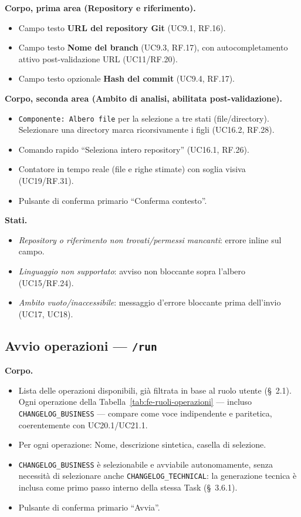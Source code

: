\documentclass[11pt,a4paper]{article}
\begin{document}
\textbf{Corpo, prima area (Repository e riferimento).}
\begin{itemize}
    \item Campo testo \textbf{URL del repository Git} (UC9.1, RF.16).
    \item Campo testo \textbf{Nome del branch} (UC9.3, RF.17), con autocompletamento attivo post-validazione URL (UC11/RF.20).
    \item Campo testo opzionale \textbf{Hash del commit} (UC9.4, RF.17).
\end{itemize}

\textbf{Corpo, seconda area (Ambito di analisi, abilitata post-validazione).}
\begin{itemize}
    \item \texttt{Componente: Albero file} per la selezione a tre stati (file/directory). Selezionare una directory marca ricorsivamente i figli (UC16.2, RF.28).
    \item Comando rapido ``Seleziona intero repository'' (UC16.1, RF.26).
    \item Contatore in tempo reale (file e righe stimate) con soglia visiva (UC19/RF.31).
    \item Pulsante di conferma primario ``Conferma contesto''.
\end{itemize}

\textbf{Stati.}
\begin{itemize}
    \item \emph{Repository o riferimento non trovati/permessi mancanti}: errore inline sul campo.
    \item \emph{Linguaggio non supportato}: avviso non bloccante sopra l'albero (UC15/RF.24).
    \item \emph{Ambito vuoto/inaccessibile}: messaggio d'errore bloccante prima dell'invio (UC17, UC18).
\end{itemize}

\subsection{Avvio operazioni --- \texttt{/run}}

\textbf{Corpo.}
\begin{itemize}
    \item Lista delle operazioni disponibili, già filtrata in base al ruolo utente (\S~2.1). Ogni operazione della Tabella~\ref{tab:fe-ruoli-operazioni} --- incluso \texttt{CHANGELOG\_BUSINESS} --- compare come voce indipendente e paritetica, coerentemente con UC20.1/UC21.1.
    \item Per ogni operazione: Nome, descrizione sintetica, casella di selezione.
    \item \texttt{CHANGELOG\_BUSINESS} è selezionabile e avviabile autonomamente, senza necessità di selezionare anche \texttt{CHANGELOG\_TECHNICAL}: la generazione tecnica è inclusa come primo passo interno della stessa Task (\S~3.6.1).
    \item Pulsante di conferma primario ``Avvia''.
\end{itemize}
\end{document}
